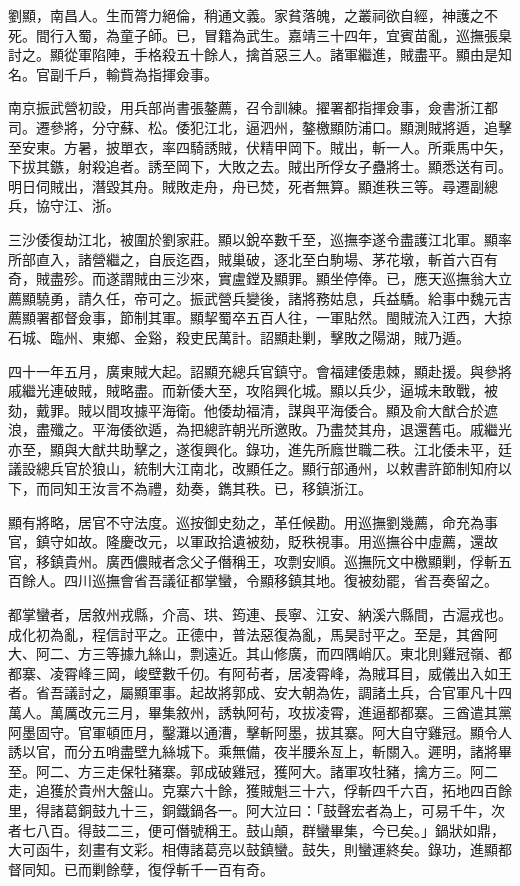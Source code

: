 \begin{pinyinscope}
劉顯，南昌人。生而膂力絕倫，稍通文義。家貧落魄，之叢祠欲自經，神護之不死。間行入蜀，為童子師。已，冒籍為武生。嘉靖三十四年，宜賓苗亂，巡撫張臬討之。顯從軍陷陣，手格殺五十餘人，擒首惡三人。諸軍繼進，賊盡平。顯由是知名。官副千戶，輸貲為指揮僉事。

南京振武營初設，用兵部尚書張鏊薦，召令訓練。擢署都指揮僉事，僉書浙江都司。遷參將，分守蘇、松。倭犯江北，逼泗州，鏊檄顯防浦口。顯測賊將遁，追擊至安東。方暑，披單衣，率四騎誘賊，伏精甲岡下。賊出，斬一人。所乘馬中矢，下拔其鏃，射殺追者。誘至岡下，大敗之去。賊出所俘女子蠱將士。顯悉送有司。明日伺賊出，潛毀其舟。賊敗走舟，舟已焚，死者無算。顯進秩三等。尋遷副總兵，協守江、浙。

三沙倭復劫江北，被圍於劉家莊。顯以銳卒數千至，巡撫李遂令盡護江北軍。顯率所部直入，諸營繼之，自辰迄酉，賊巢破，逐北至白駒場、茅花墩，斬首六百有奇，賊盡殄。而遂謂賊由三沙來，實盧鏜及顯罪。顯坐停俸。已，應天巡撫翁大立薦顯驍勇，請久任，帝可之。振武營兵變後，諸將務姑息，兵益驕。給事中魏元吉薦顯署都督僉事，節制其軍。顯挈蜀卒五百人往，一軍貼然。閩賊流入江西，大掠石城、臨州、東鄉、金谿，殺吏民萬計。詔顯赴剿，擊敗之陽湖，賊乃遁。

四十一年五月，廣東賊大起。詔顯充總兵官鎮守。會福建倭患棘，顯赴援。與參將戚繼光連破賊，賊略盡。而新倭大至，攻陷興化城。顯以兵少，逼城未敢戰，被劾，戴罪。賊以間攻據平海衛。他倭劫福清，謀與平海倭合。顯及俞大猷合於遮浪，盡殲之。平海倭欲遁，為把總許朝光所邀敗。乃盡焚其舟，退還舊屯。戚繼光亦至，顯與大猷共助擊之，遂復興化。錄功，進先所廕世職二秩。江北倭未平，廷議設總兵官於狼山，統制大江南北，改顯任之。顯行部通州，以敕書許節制知府以下，而同知王汝言不為禮，劾奏，鐫其秩。已，移鎮浙江。

顯有將略，居官不守法度。巡按御史劾之，革任候勘。用巡撫劉幾薦，命充為事官，鎮守如故。隆慶改元，以軍政拾遺被劾，貶秩視事。用巡撫谷中虛薦，還故官，移鎮貴州。廣西儂賊者念父子僭稱王，攻剽安順。巡撫阮文中檄顯剿，俘斬五百餘人。四川巡撫會省吾議征都掌蠻，令顯移鎮其地。復被劾罷，省吾奏留之。

都掌蠻者，居敘州戎縣，介高、珙、筠連、長寧、江安、納溪六縣間，古滬戎也。成化初為亂，程信討平之。正德中，普法惡復為亂，馬昊討平之。至是，其酋阿大、阿二、方三等據九絲山，剽遠近。其山修廣，而四隅峭仄。東北則雞冠嶺、都都寨、凌霄峰三岡，峻壁數千仞。有阿茍者，居凌霄峰，為賊耳目，威儀出入如王者。省吾議討之，屬顯軍事。起故將郭成、安大朝為佐，調諸土兵，合官軍凡十四萬人。萬厲改元三月，畢集敘州，誘執阿茍，攻拔凌霄，進逼都都寨。三酋遣其黨阿墨固守。官軍頓匝月，鑿灘以通漕，擊斬阿墨，拔其寨。阿大自守雞冠。顯令人誘以官，而分五哨盡壁九絲城下。乘無備，夜半腰糸亙上，斬關入。遲明，諸將畢至。阿二、方三走保牡豬寨。郭成破雞冠，獲阿大。諸軍攻牡豬，擒方三。阿二走，追獲於貴州大盤山。克寨六十餘，獲賊魁三十六，俘斬四千六百，拓地四百餘里，得諸葛銅鼓九十三，銅鐵鍋各一。阿大泣曰：「鼓聲宏者為上，可易千牛，次者七八百。得鼓二三，便可僭號稱王。鼓山顛，群蠻畢集，今已矣。」鍋狀如鼎，大可函牛，刻畫有文彩。相傳諸葛亮以鼓鎮蠻。鼓失，則蠻運終矣。錄功，進顯都督同知。已而剿餘孽，復俘斬千一百有奇。


\end{pinyinscope}
